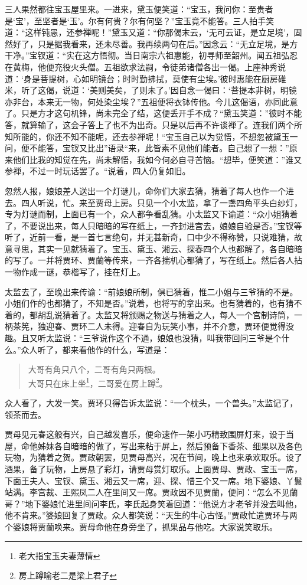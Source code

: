 \documentclass[12pt,oneside]{book}
\newenvironment{shici}{%
\begin{verse}%
\centering\large\hspace{12pt}}%
{\end{verse}}
\begin{document}
三人果然都往宝玉屋里来。一进来，黛玉便笑道：“宝玉，我问你：至贵者是‘宝’，至坚者是‘玉’。尔有何贵？尔有何坚？”宝玉竟不能答。三人拍手笑道：“这样钝愚，还参禅呢！”黛玉又道：“你那偈末云，‘无可云证，是立足境’，固然好了，只是据我看来，还未尽善。我再续两句在后。”因念云：“无立足境，是方干净。”宝钗道：“实在这方悟彻。当日南宗六祖惠能，初寻师至韶州。闻五祖弘忍在黄梅，他便充役火头僧。五祖欲求法嗣，令徒弟诸僧各出一偈。上座神秀说道：‘身是菩提树，心如明镜台；时时勤拂拭，莫使有尘埃。’彼时惠能在厨房碓米，听了这偈，说道：‘美则美矣，了则未了。’因自念一偈曰：‘菩提本非树，明镜亦非台，本来无一物，何处染尘埃？”五祖便将衣钵传他。今儿这偈语，亦同此意了。只是方才这句机锋，尚未完全了结，这便丢开手不成？“黛玉笑道：”彼时不能答，就算输了，这会子答上了也不为出奇。只是以后再不许谈禅了。连我们两个所知所能的，你还不知不能呢，还去参禅呢！“宝玉自己以为觉悟，不想忽被黛玉一问，便不能答，宝钗又比出”语录“来，此皆素不见他们能者。自己想了一想：”原来他们比我的知觉在先，尚未解悟，我如今何必自寻苦恼。“想毕，便笑道：”谁又参禅，不过一时玩话罢了。“说着，四人仍复如旧。

忽然人报，娘娘差人送出一个灯谜儿，命你们大家去猜，猜着了每人也作一个进去。四人听说，忙。来至贾母上房。只见一个小太监，拿了一盏四角平头白纱灯，专为灯谜而制，上面已有一个，众人都争看乱猜。小太监又下谕道：“众小姐猜着了，不要说出来，每人只暗暗的写在纸上，一齐封进宫去，娘娘自验是否。”宝钗等听了，近前一看，是一首七言绝句，并无甚新奇，口中少不得称赞，只说难猜，故意寻思，其实一见就猜着了。宝玉、黛玉、湘云、探春四个人也都解了，各自暗暗的写了。一并将贾环、贾蘭等传来，一齐各揣机心都猜了，写在纸上。然后各人拈一物作成一谜，恭楷写了，挂在灯上。

太监去了，至晚出来传谕：“前娘娘所制，俱已猜着，惟二小姐与三爷猜的不是。小姐们作的也都猜了，不知是否。”说着，也将写的拿出来。也有猜着的，也有猜不着的，都胡乱说猜着了。太监又将颁赐之物送与猜着之人，每人一个宫制诗筒，一柄茶筅，独迎春、贾环二人未得。迎春自为玩笑小事，并不介意，贾环便觉得没趣。且又听太监说：“三爷说作这个不通，娘娘也没猜，叫我带回问三爷是个什么。”众人听了，都来看他作的什么，写道是：

\begin{shici}
大哥有角只八个，二哥有角只两根。\\
大哥只在床上坐\footnote{老大指宝玉夫妻薄情}，二哥爱在房上蹲\footnote{房上蹲喻老二是梁上君子}。
\end{shici}


众人看了，大发一笑。贾环只得告诉太监说：“一个枕头，一个兽头。”太监记了，领茶而去。

贾母见元春这般有兴，自己越发喜乐，便命速作一架小巧精致围屏灯来，设于当屋，命他姊妹各自暗暗的做了，写出来粘于屏上，然后预备下香茶、细果以及各色玩物，为猜着之贺。贾政朝罢，见贾母高兴，况在节间，晚上也来承欢取乐。设了酒果，备了玩物，上房悬了彩灯，请贾母赏灯取乐。上面贾母、贾政、宝玉一席，下面王夫人、宝钗、黛玉、湘云又一席，迎、探、惜三个又一席。地下婆娘、丫鬟站满。李宫裁、王熙凤二人在里间又一席。贾政因不见贾蘭，便问：“怎么不见蘭哥？”地下婆娘忙进里间问李氏，李氏起身笑着回道：“他说方才老爷并没去叫他，他不肯来。”婆娘回复了贾政。众人都笑说：“天生的牛心古怪。”贾政忙遣贾环与两个婆娘将贾蘭唤来。贾母命他在身旁坐了，抓果品与他吃。大家说笑取乐。
\end{document}
